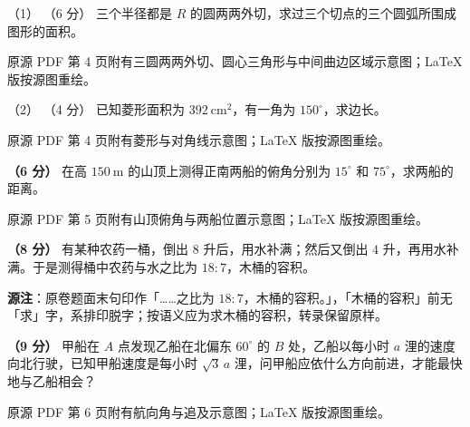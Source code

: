\begin{question}

（1） （6 分） 三个半径都是 $R$ 的圆两两外切，求过三个切点的三个圆弧所围成图形的面积。

\begin{gktip}
原源 PDF 第 4 页附有三圆两两外切、圆心三角形与中间曲边区域示意图；LaTeX 版按源图重绘。
\end{gktip}
\nopagebreak[4]
\begin{center}\end{center}
\nopagebreak[4]
（2） （4 分） 已知菱形面积为 $392\ \mathrm{cm^2}$，有一角为 $150^\circ$，求边长。

\begin{gktip}
原源 PDF 第 4 页附有菱形与对角线示意图；LaTeX 版按源图重绘。
\end{gktip}
\nopagebreak[4]
\begin{center}\end{center}
\nopagebreak[4]
\Needspace{0.4\textheight}
\end{question}
\begin{question}
\textbf{（6 分）} 在高 $150\ \mathrm{m}$ 的山顶上测得正南两船的俯角分别为 $15^\circ$ 和 $75^\circ$，求两船的距离。

\begin{gktip}
原源 PDF 第 5 页附有山顶俯角与两船位置示意图；LaTeX 版按源图重绘。
\end{gktip}
\nopagebreak[4]
\begin{center}\end{center}
\nopagebreak[4]
\end{question}
\begin{question}
\textbf{（8 分）} 有某种农药一桶，倒出 $8$ 升后，用水补满；然后又倒出 $4$ 升，再用水补满。于是测得桶中农药与水之比为 $18:7$，木桶的容积。

\begin{gktip}
\textbf{源注}：原卷题面末句印作「……之比为 $18:7$，木桶的容积。」，「木桶的容积」前无「求」字，系排印脱字；按语义应为求木桶的容积，转录保留原样。
\end{gktip}

\Needspace{0.4\textheight}
\end{question}
\begin{question}
\textbf{（9 分）} 甲船在 $A$ 点发现乙船在北偏东 $60^\circ$ 的 $B$ 处，乙船以每小时 $a$ 浬的速度向北行驶，已知甲船速度是每小时 $\sqrt3\,a$ 浬，问甲船应依什么方向前进，才能最快地与乙船相会？

\begin{gktip}
原源 PDF 第 6 页附有航向角与追及示意图；LaTeX 版按源图重绘。
\end{gktip}
\nopagebreak[4]
\begin{center}\end{center}
\nopagebreak[4]
\Needspace{0.4\textheight}
\end{question}
